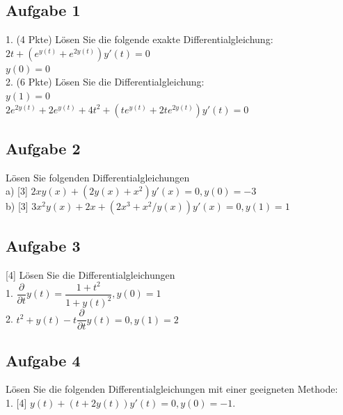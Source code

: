 \documentclass[11pt,final]{scrreprt}
\begin{document}
\subsection{Aufgabe 1}

1. (4 Pkte) Lösen Sie die folgende exakte Differentialgleichung:\\

$2 t + \left(e^{y(t)} + e^{2y(t)}\right)y'(t) = 0$\\
$ y(0) = 0$\\

2. (6 Pkte) Lösen Sie die Differentialgleichung:\\

$y(1) = 0$\\
$2e^{2y(t)} + 2e^{y(t)} + 4t^2 +\left(te^{y(t)} + 2te^{2y(t)}\right)y'(t) = 0$\\

\subsection{Aufgabe 2}

Lösen Sie folgenden Differentialgleichungen\\

a) [3] $2xy(x) + (2y(x) + x^2)y'(x) = 0, y(0) = -3$\\

b) [3] $3x^2y(x) + 2x + (2x^3 + x^2/y(x) )y'(x) = 0, y(1) = 1$\\

\subsection{Aufgabe 3}

[4] Lösen Sie die Differentialgleichungen\\

1. $\dfrac{\partial}{\partial t}y(t) =\dfrac{1 + t^2}{1 + y(t)^2} , y(0) = 1$\\

2. $t^2 + y(t) - t\dfrac{\partial}{\partial t}y(t) = 0, y(1) = 2 $\\

\subsection{Aufgabe 4}

Lösen Sie die folgenden Differentialgleichungen mit einer geeigneten Methode:\\

1. [4] $y(t) + (t + 2y(t))y'(t) = 0, y(0) = -1.$\\
\end{document}
